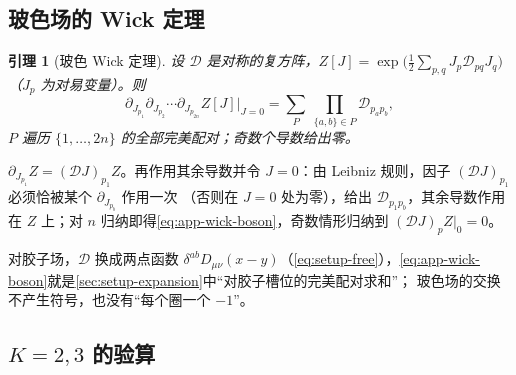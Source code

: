 \documentclass[UTF8,a4paper,11pt,fontset=fandol]{ctexart}
\makeatletter
\theoremstyle{cplain}
\newtheorem{lemma}[theorem]{引理}
\theoremstyle{cdefinition}
\theoremstyle{cremark}
\renewcommand{\proofname}{证明}
\renewenvironment{proof}[1][\proofname]{\par\pushQED{\qed}\normalfont\topsep6\p@\@plus6\p@\relax
  \trivlist\item[\hskip\labelsep\itshape #1\hspace{0.5em}]\ignorespaces}{\popQED\endtrivlist\@endpefalse}
\numberwithin{equation}{section}
\makeatother
\begin{document}
\subsection{玻色场的 Wick 定理}\label{app:wick-boson}

\begin{lemma}[玻色 Wick 定理]\label{lem:app-wick-boson}
设 $\mathcal D$ 是对称的复方阵，$Z[J]=\exp\bigl(\tfrac12\sum_{p,q}J_p\mathcal D_{pq}J_q\bigr)$（$J_p$ 为对易变量）。则
\begin{equation}\label{eq:app-wick-boson}
\partial_{J_{p_1}}\partial_{J_{p_2}}\cdots\partial_{J_{p_{2n}}}Z[J]\big|_{J=0}=\sum_{P}\ \prod_{\{a,b\}\in P}\mathcal D_{p_ap_b},
\end{equation}
$P$ 遍历 $\{1,\dots,2n\}$ 的全部完美配对；奇数个导数给出零。
\end{lemma}

\begin{proof}
$\partial_{J_{p_1}}Z=(\mathcal DJ)_{p_1}Z$。再作用其余导数并令 $J=0$：由 Leibniz 规则，因子 $(\mathcal DJ)_{p_1}$ 必须恰被某个 $\partial_{J_{p_b}}$ 作用一次
（否则在 $J=0$ 处为零），给出 $\mathcal D_{p_1p_b}$，其余导数作用在 $Z$ 上；对 $n$ 归纳即得\cref{eq:app-wick-boson}，奇数情形归纳到 $(\mathcal DJ)_pZ|_0=0$。
\end{proof}

对胶子场，$\mathcal D$ 换成两点函数 $\delta^{ab}D_{\mu\nu}(x-y)$（\cref{eq:setup-free}），\cref{eq:app-wick-boson}就是\cref{sec:setup-expansion}中“对胶子槽位的完美配对求和”；
玻色场的交换不产生符号，也没有“每个圈一个 $-1$”。

\subsection{\texorpdfstring{$K=2,3$}{K=2,3} 的验算}\label{app:wick-check}
\end{document}
